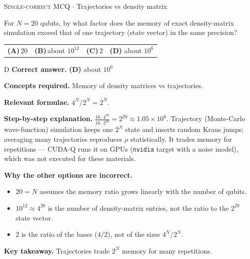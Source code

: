 \documentclass[11pt,a4paper]{article}
\newcommand{\optlabel}[1]{\textbf{(#1)}}
\newcommand{\correctlabel}[1]{\textcolor{okgreen}{\textbf{(#1)}\,\ding{51}}}
\newenvironment{qitem}[1]{\begin{list}{}{\setlength{\leftmargin}{3.3em}\setlength{\labelwidth}{3.1em}%
  \setlength{\labelsep}{0.2em}\setlength{\topsep}{3pt}\setlength{\parsep}{3pt}}\item[\textbf{Q.#1}\hfill]}{\end{list}}
\newcommand{\qsep}{\par\vspace{2pt}{\color{black!15}\hrule}\vspace{4pt}}
\newcommand{\qmeta}[2]{{\footnotesize\color{black!60}\textsc{#1} \;$\cdot$\; #2}\par}
\begin{document}
\begin{qitem}{53}
\qmeta{Single-correct MCQ}{Trajectories vs density matrix}
For $N = 20$ qubits, by what factor does the memory of exact density-matrix simulation exceed that of one trajectory (state vector) in the same precision?
\par\smallskip\noindent\begin{tabularx}{\linewidth}{@{}*{4}{L}@{}}
\optlabel{A}\,$20$ & \optlabel{B}\,about $10^{12}$ & \optlabel{C}\,$2$ & \correctlabel{D}\,about $10^6$
\end{tabularx}
\end{qitem}
\begin{solbox}{D}
\textbf{\color{brand}Correct answer.} \textcolor{okgreen}{\textbf{(D)}} about $10^6$

\textbf{\color{brand}Concepts required.} Memory of density matrices vs trajectories.

\textbf{\color{brand}Relevant formulae.} $4^N/2^N = 2^N$.

\textbf{\color{brand}Step-by-step explanation.} $\frac{16\cdot4^{20}}{16\cdot2^{20}} = 2^{20} \approx 1.05\times10^6$. Trajectory (Monte-Carlo wave-function) simulation keeps one $2^N$ state and inserts random
Kraus jumps; averaging many trajectories reproduces $\rho$ statistically. It trades memory for repetitions --- CUDA-Q runs it on GPUs (\texttt{nvidia} target with a
noise model), which was not executed for these materials.

\textbf{\color{brand}Why the other options are incorrect.}
\begin{itemize}[leftmargin=2.4em, itemsep=1pt, topsep=2pt]
\item[\textbf{(A)}] $20 = N$ assumes the memory ratio grows linearly with the number of qubits.
\item[\textbf{(B)}] $10^{12} \approx 4^{20}$ is the number of density-matrix entries, not the ratio to the $2^{20}$ state vector.
\item[\textbf{(C)}] $2$ is the ratio of the bases ($4/2$), not of the sizes $4^N/2^N$.
\end{itemize}
\textbf{\color{brand}Key takeaway.} Trajectories trade $2^N$ memory for many repetitions.
\end{solbox}
\qsep
\end{document}
